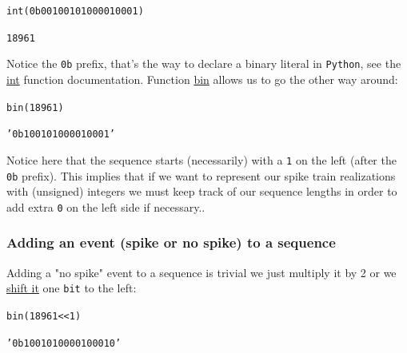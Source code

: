 \documentclass[11pt]{scrartcl}
\renewenvironment{verbatim}{\begin{alltt} \scriptsize \color{Bittersweet} \vspace{0.2cm} }{\vspace{0.2cm} \end{alltt} \normalsize \color{black}}
\begin{document}
\begin{verbatim}
int(0b00100101000010001)
\end{verbatim}

\begin{verbatim}
18961
\end{verbatim}



Notice the \texttt{0b} prefix, that's the way to declare a binary literal in \texttt{Python}, see the \href{https://docs.python.org/3/library/functions.html?highlight=bin\\\#int}{int} function documentation. Function \href{https://docs.python.org/3/library/functions.html?highlight=bin\\\#bin}{bin} allows us to go the other way around:

\begin{verbatim}
bin(18961)
\end{verbatim}

\begin{verbatim}
'0b100101000010001'
\end{verbatim}



Notice here that the sequence starts (necessarily) with a \texttt{1} on the left (after the \texttt{0b} prefix). This implies that if we want to represent our spike train realizations with (unsigned) integers we must keep track of our sequence lengths in order to add extra \texttt{0} on the left side if necessary..  

\subsubsection{Adding an event (spike or no spike) to a sequence}
\label{sec:orgbca973b}

Adding a "no spike" event to a sequence is trivial we just multiply it by 2 or we \href{https://docs.python.org/3/library/stdtypes.html\\\#bitwise-operations-on-integer-types}{shift it} one \texttt{bit} to the left:

\begin{verbatim}
bin(18961 << 1)
\end{verbatim}

\begin{verbatim}
'0b1001010000100010'
\end{verbatim}
\end{document}
